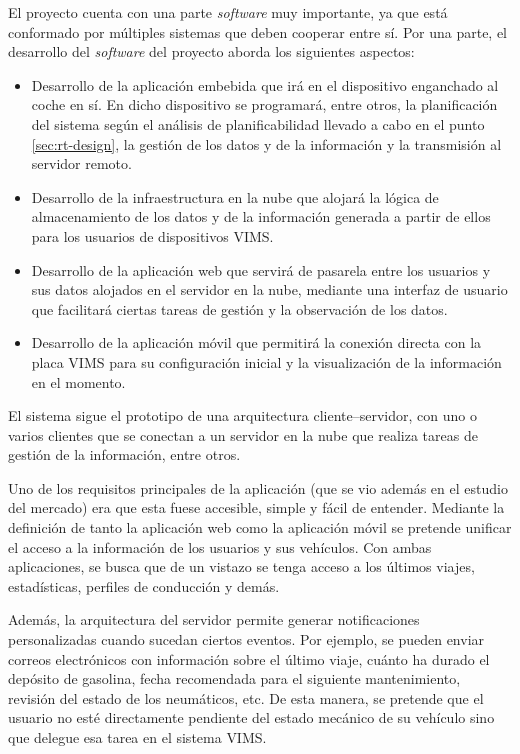 El proyecto cuenta con una parte \textit{software} muy importante, ya que está
conformado por múltiples sistemas que deben cooperar entre sí. Por una parte,
el desarrollo del \textit{software} del proyecto aborda los siguientes aspectos:

\begin{itemize}
  \item Desarrollo de la aplicación embebida que irá en el dispositivo enganchado
        al coche en sí. En dicho dispositivo se programará, entre otros, la planificación
        del sistema según el análisis de planificabilidad llevado a cabo en el punto
        \ref{sec:rt-design}, la gestión de los datos y de la información y la transmisión
        al servidor remoto.
  \item Desarrollo de la infraestructura en la nube que alojará la lógica de almacenamiento de
        los datos y de la información generada a partir de ellos para los usuarios de
        dispositivos \ac{VIMS}.
  \item Desarrollo de la aplicación web que servirá de pasarela entre los usuarios
        y sus datos alojados en el servidor en la nube, mediante una interfaz de usuario
        que facilitará ciertas tareas de gestión y la observación de los datos.
  \item Desarrollo de la aplicación móvil que permitirá la conexión directa con la
        placa \ac{VIMS} para su configuración inicial y la visualización de la información
        en el momento.
\end{itemize}

El sistema sigue el prototipo de una arquitectura cliente--servidor, con uno o varios
clientes que se conectan a un servidor en la nube que realiza tareas de gestión de
la información, entre otros.

Uno de los requisitos principales de la aplicación (que se vio además en el estudio
del mercado) era que esta fuese accesible, simple y fácil de entender. Mediante la
definición de tanto la aplicación web como la aplicación móvil se pretende unificar
el acceso a la información de los usuarios y sus vehículos. Con ambas aplicaciones,
se busca que de un vistazo se tenga acceso a los últimos viajes, estadísticas,
perfiles de conducción y demás.

Además, la arquitectura del servidor permite generar notificaciones personalizadas
cuando sucedan ciertos eventos. Por ejemplo, se pueden enviar correos electrónicos
con información sobre el último viaje, cuánto ha durado el depósito de gasolina, fecha
recomendada para el siguiente mantenimiento, revisión del estado de los neumáticos,
etc. De esta manera, se pretende que el usuario no esté directamente pendiente del
estado mecánico de su vehículo sino que delegue esa tarea en el sistema \ac{VIMS}.

